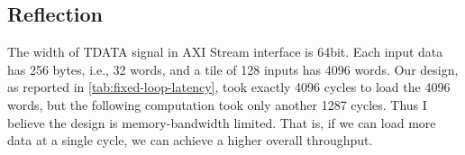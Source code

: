 \subsection{Reflection}

The width of TDATA signal in AXI Stream interface is 64bit.
Each input data has 256 bytes, i.e., 32 words, and a tile of 128 inputs has 4096 words.
Our design, as reported in \autoref{tab:fixed-loop-latency}, took exactly 4096 cycles to load the 4096 words, but the following computation took only another 1287 cycles.
Thus I believe the design is memory-bandwidth limited.
That is, if we can load more data at a single cycle, we can achieve a higher overall throughput.

